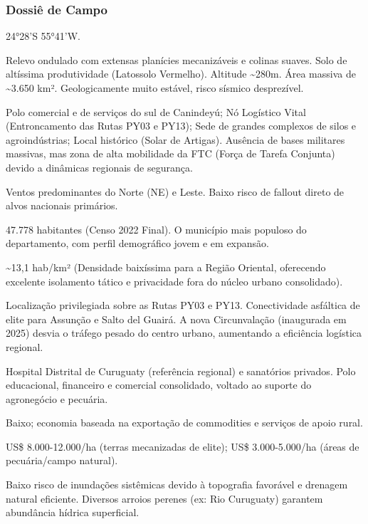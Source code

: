 \subsubsection{Dossiê de Campo}
\begin{description}[style=nextline,leftmargin=0.5cm,font=\bfseries]
\item[Coordenadas]  24°28'S 55°41'W.
\item[Topografia]  Relevo ondulado com extensas planícies mecanizáveis e colinas suaves. Solo de altíssima produtividade (Latossolo Vermelho). Altitude \textasciitilde 280m. Área massiva de \textasciitilde 3.650 km². Geologicamente muito estável, risco sísmico desprezível.
\item[Alvos Estratégicos]  Polo comercial e de serviços do sul de Canindeyú; Nó Logístico Vital (Entroncamento das Rutas PY03 e PY13); Sede de grandes complexos de silos e agroindústrias; Local histórico (Solar de Artigas). Ausência de bases militares massivas, mas zona de alta mobilidade da FTC (Força de Tarefa Conjunta) devido a dinâmicas regionais de segurança.
\item[Fallout]  Ventos predominantes do Norte (NE) e Leste. Baixo risco de fallout direto de alvos nacionais primários.
\item[População]  47.778 habitantes (Censo 2022 Final). O município mais populoso do departamento, com perfil demográfico jovem e em expansão.
\item[Densidade]  \textasciitilde 13,1 hab/\allowbreak km² (Densidade baixíssima para a Região Oriental, oferecendo excelente isolamento tático e privacidade fora do núcleo urbano consolidado).
\item[Vias de Acesso]  Localização privilegiada sobre as Rutas PY03 e PY13. Conectividade asfáltica de elite para Assunção e Salto del Guairá. A nova Circunvalação (inaugurada em 2025) desvia o tráfego pesado do centro urbano, aumentando a eficiência logística regional.
\item[Serviços]  Hospital Distrital de Curuguaty (referência regional) e sanatórios privados. Polo educacional, financeiro e comercial consolidado, voltado ao suporte do agronegócio e pecuária.
\item[Custo de Vida]  Baixo; economia baseada na exportação de commodities e serviços de apoio rural.
\item[Preço da Terra]  US\$ 8.000-12.000/\allowbreak ha (terras mecanizadas de elite); US\$ 3.000-5.000/\allowbreak ha (áreas de pecuária/\allowbreak campo natural).
\item[Hidrologia]  Baixo risco de inundações sistêmicas devido à topografia favorável e drenagem natural eficiente. Diversos arroios perenes (ex: Rio Curuguaty) garantem abundância hídrica superficial.

\end{description}
